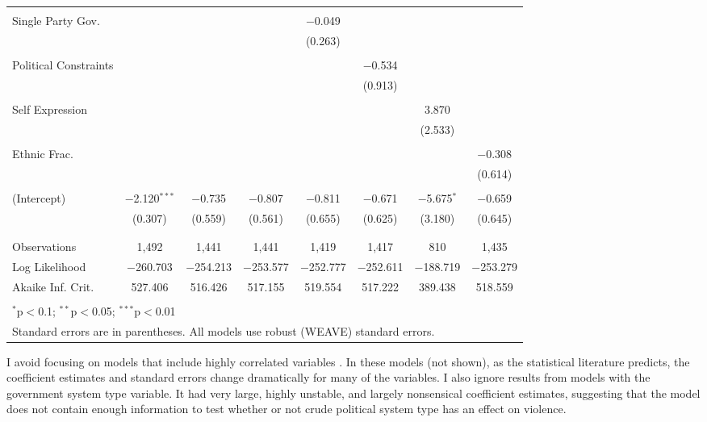 \documentclass[a4paper]{article}\usepackage[]{graphicx}\usepackage[]{color}
\begin{document}
\begin{table}
\begin{center}
{\begin{tabular}{@{\extracolsep{5pt}}lccccccc}
  & & & & & & & \\ 
 Single Party Gov. &  &  &  & $-$0.049 &  &  &  \\ 
  &  &  &  & (0.263) &  &  &  \\ 
  & & & & & & & \\ 
 Political Constraints &  &  &  &  & $-$0.534 &  &  \\ 
  &  &  &  &  & (0.913) &  &  \\ 
  & & & & & & & \\ 
 Self Expression &  &  &  &  &  & 3.870 &  \\ 
  &  &  &  &  &  & (2.533) &  \\ 
  & & & & & & & \\ 
 Ethnic Frac. &  &  &  &  &  &  & $-$0.308 \\ 
  &  &  &  &  &  &  & (0.614) \\ 
  & & & & & & & \\ 
 (Intercept) & $-$2.120$^{***}$ & $-$0.735 & $-$0.807 & $-$0.811 & $-$0.671 & $-$5.675$^{*}$ & $-$0.659 \\ 
  & (0.307) & (0.559) & (0.561) & (0.655) & (0.625) & (3.180) & (0.645) \\ 
  & & & & & & & \\ 
\hline \\[-1.8ex] 
Observations & 1,492 & 1,441 & 1,441 & 1,419 & 1,417 & 810 & 1,435 \\ 
Log Likelihood & $-$260.703 & $-$254.213 & $-$253.577 & $-$252.777 & $-$252.611 & $-$188.719 & $-$253.279 \\ 
Akaike Inf. Crit. & 527.406 & 516.426 & 517.155 & 519.554 & 517.222 & 389.438 & 518.559 \\ 
\hline 
\hline \\[-1.8ex] 
\multicolumn{8}{l}{$^{*}$p$<$0.1; $^{**}$p$<$0.05; $^{***}$p$<$0.01} \\ 
\multicolumn{8}{l}{Standard errors are in parentheses. All models use robust (WEAVE) standard errors.} \\ 
\end{tabular} 

}
\end{center}
\end{table}

I avoid focusing on models that include highly correlated variables \citep[]{Achen2002, Schrodt2006}. In these models (not shown), as the statistical literature predicts, the coefficient estimates and standard errors change dramatically for many of the variables. I also ignore results from models with the government system type variable. It had very large, highly unstable, and largely nonsensical coefficient estimates, suggesting that the model does not contain enough information to test \citep{Babyak2004} whether or not crude political system type has an effect on violence. 
\end{document}
